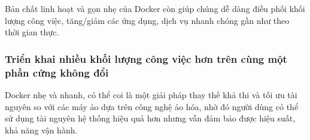 Bản chất linh hoạt và gọn nhẹ của Docker còn giúp chúng dễ dàng điều phối khối lượng công việc, tăng/giảm các ứng dụng, dịch vụ nhanh chóng gần như theo thời gian thực.

\subsubsection{Triển khai nhiều khối lượng công việc hơn trên cùng một phần cứng không đổi}

Docker nhẹ và nhanh, có thể coi là một giải pháp thay thế khả thi và tối ưu tài nguyên so với các máy ảo dựa trên công nghệ ảo hóa, nhờ đó người dùng có thể sử dụng tài nguyên hệ thống hiệu quả hơn nhưng vẫn đảm bảo được hiệu suất, khả năng vận hành.








